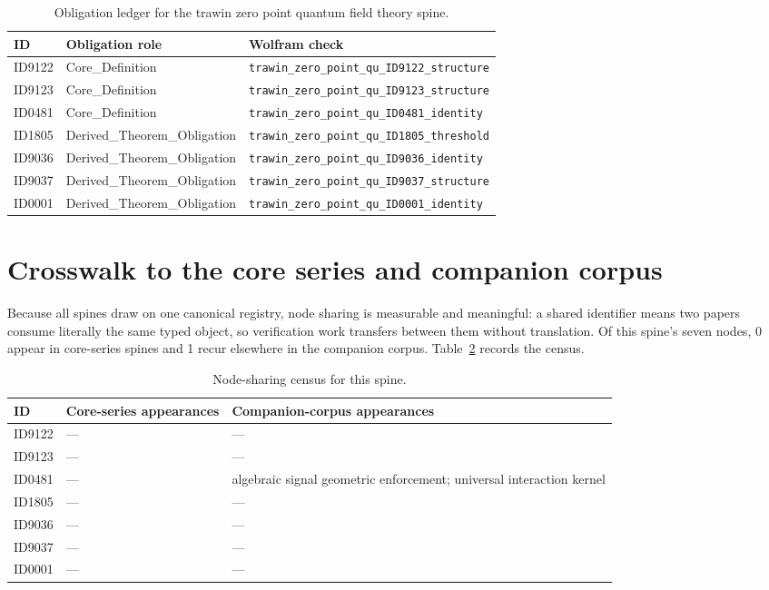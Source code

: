 \documentclass[11pt]{article}
\theoremstyle{remark}
\begin{document}
\begin{table}[ht]
\centering
\small
\caption{Obligation ledger for the trawin zero point quantum field theory spine.}
\label{tab:obligations}
\begin{tabular}{llp{6.2cm}}
\toprule
ID & Obligation role & Wolfram check \\
\midrule
ID9122 & Core\_Definition & \texttt{trawin\_zero\_point\_qu\_ID9122\_structure} \\
ID9123 & Core\_Definition & \texttt{trawin\_zero\_point\_qu\_ID9123\_structure} \\
ID0481 & Core\_Definition & \texttt{trawin\_zero\_point\_qu\_ID0481\_identity} \\
ID1805 & Derived\_Theorem\_Obligation & \texttt{trawin\_zero\_point\_qu\_ID1805\_threshold} \\
ID9036 & Derived\_Theorem\_Obligation & \texttt{trawin\_zero\_point\_qu\_ID9036\_identity} \\
ID9037 & Derived\_Theorem\_Obligation & \texttt{trawin\_zero\_point\_qu\_ID9037\_structure} \\
ID0001 & Derived\_Theorem\_Obligation & \texttt{trawin\_zero\_point\_qu\_ID0001\_identity} \\
\bottomrule
\end{tabular}
\end{table}

\section{Crosswalk to the core series and companion corpus}
\label{sec:crosswalk}

Because all spines draw on one canonical registry, node sharing is measurable and meaningful: a shared identifier means two papers consume literally the same typed object, so verification work transfers between them without translation. Of this spine's seven nodes, 0 appear in core-series spines and 1 recur elsewhere in the companion corpus. Table~\ref{tab:crosswalk} records the census.

\begin{table}[ht]
\centering
\small
\caption{Node-sharing census for this spine.}
\label{tab:crosswalk}
\begin{tabular}{lp{4.4cm}p{6.6cm}}
\toprule
ID & Core-series appearances & Companion-corpus appearances \\
\midrule
ID9122 & --- & --- \\
ID9123 & --- & --- \\
ID0481 & --- & algebraic signal geometric enforcement; universal interaction kernel \\
ID1805 & --- & --- \\
ID9036 & --- & --- \\
ID9037 & --- & --- \\
ID0001 & --- & --- \\
\bottomrule
\end{tabular}
\end{table}
\end{document}

